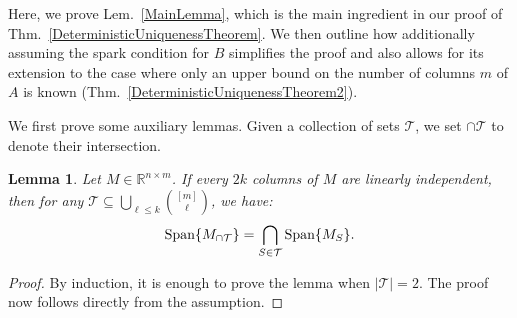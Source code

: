 \documentclass[journal, twocolumn]{IEEEtran}
\newtheorem{lemma}{Lemma}
\begin{document}
Here, we prove Lem.~\ref{MainLemma}, which is the main ingredient in our proof of Thm.~\ref{DeterministicUniquenessTheorem}. We then outline how additionally assuming the spark condition for $B$ simplifies the proof and also allows for its extension to the case where only an upper bound on the number of columns $m$ of $A$ is known (Thm.~\ref{DeterministicUniquenessTheorem2}). 

We first prove some auxiliary lemmas. %
Given a collection of sets $\mathcal{T}$, we set $\cap \mathcal{T}$ to denote their intersection.


\begin{lemma}\label{SpanIntersectionLemma}
Let $M \in \mathbb{R}^{n \times m}$. If every $2k$ columns of $M$ are linearly independent, then for any $\mathcal{T} \subseteq \bigcup_{\ell \leq k} {[m] \choose \ell}$, we have:
\begin{align*}
\text{\rm Span}\{M_{\cap \mathcal{T}}\}  = \bigcap_{S \in \mathcal{T}} \text{\rm Span}\{M_S\}.
\end{align*}
\end{lemma}

\begin{proof}By induction, it is enough to prove the lemma when $|\mathcal{T}| = 2$. The proof now follows directly from the assumption.
\end{proof}


\end{document}
